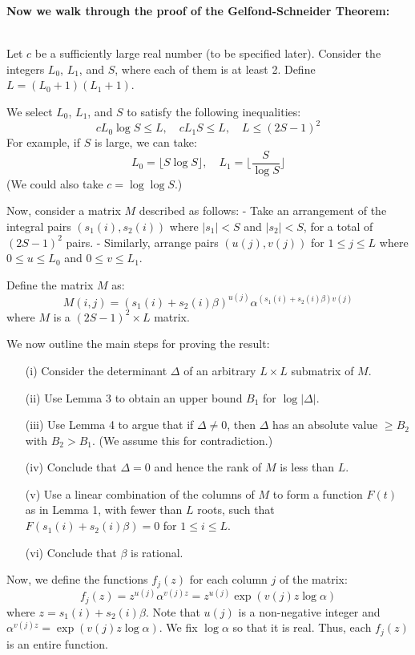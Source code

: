 \documentclass{article}
\newenvironment{proofbox}
  {\begin{mdframed}[linewidth=1pt,linecolor=black,backgroundcolor=white]\noindent\ignorespaces}
  {\end{mdframed}}
\begin{document}
\textbf{Now we walk through the proof of the Gelfond-Schneider Theorem:}\\\\
\begin{proofbox}
   
Let $c$ be a sufficiently large real number (to be specified later). Consider the integers $L_0$, $L_1$, and $S$, where each of them is at least 2. Define $L = (L_0 + 1)(L_1 + 1)$.

We select $L_0$, $L_1$, and $S$ to satisfy the following inequalities:
\[
c L_0 \log S \leq L, \quad c L_1 S \leq L, \quad L \leq (2S - 1)^2
\]
For example, if $S$ is large, we can take:
\[
L_0 = \lfloor S \log S \rfloor, \quad L_1 = \lfloor \frac{S}{\log S} \rfloor
\]
(We could also take $c = \log \log S$.)

Now, consider a matrix $M$ described as follows:
- Take an arrangement of the integral pairs $(s_1(i), s_2(i))$ where $|s_1| < S$ and $|s_2| < S$, for a total of $(2S - 1)^2$ pairs.
- Similarly, arrange pairs $(u(j), v(j))$ for $1 \leq j \leq L$ where $0 \leq u \leq L_0$ and $0 \leq v \leq L_1$.

Define the matrix $M$ as:
\[
M(i,j) = \left( s_1(i) + s_2(i) \beta \right)^{u(j)} \alpha^{\left( s_1(i) + s_2(i) \beta \right) v(j)}
\]
where $M$ is a $(2S - 1)^2 \times L$ matrix. 

We now outline the main steps for proving the result:
\begin{itemize}
    \item[(i)] Consider the determinant $\Delta$ of an arbitrary $L \times L$ submatrix of $M$.
    \item[(ii)] Use Lemma 3 to obtain an upper bound $B_1$ for $\log |\Delta|$.
    \item[(iii)] Use Lemma 4 to argue that if $\Delta \neq 0$, then $\Delta$ has an absolute value $\geq B_2$ with $B_2 > B_1$. (We assume this for contradiction.)
    \item[(iv)] Conclude that $\Delta = 0$ and hence the rank of $M$ is less than $L$.
    \item[(v)] Use a linear combination of the columns of $M$ to form a function $F(t)$ as in Lemma 1, with fewer than $L$ roots, such that $F(s_1(i) + s_2(i)\beta) = 0$ for $1 \leq i \leq L$.
    \item[(vi)] Conclude that $\beta$ is rational.
\end{itemize}

Now, we define the functions $f_j(z)$ for each column $j$ of the matrix:
\[
f_j(z) = z^{u(j)} \alpha^{v(j) z} = z^{u(j)} \exp \left( v(j) z \log \alpha \right)
\]
where $z = s_1(i) + s_2(i) \beta$. Note that $u(j)$ is a non-negative integer and $\alpha^{v(j) z} = \exp(v(j) z \log \alpha)$. We fix $\log \alpha$ so that it is real. Thus, each $f_j(z)$ is an entire function.


\end{proofbox}
\end{document}
